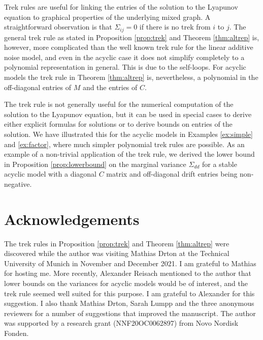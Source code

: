 \documentclass[10pt,twoside,a4paper]{amsart}
\begin{document}
Trek rules are useful for linking the entries of the solution to the Lyapunov
equation to graphical properties of the underlying mixed graph. A
straightforward observation is that $\Sigma_{ij} = 0$ if there is no trek from
$i$ to $j$. The general trek rule as stated in Proposition \ref{prop:trek} 
and Theorem \ref{thm:altrep} is, however,
more complicated than the well known trek rule for the linear additive noise
model, and even in the acyclic case it does not simplify completely to a
polynomial representation in general. This is due to the self-loops. 
For acyclic models the trek rule in Theorem \ref{thm:altrep} is, 
nevertheless, a polynomial in the off-diagonal entries of $M$ and the entries of $C$. 

The trek rule is not generally useful for the numerical computation of the 
solution to the Lyapunov equation, but it can be used in special cases to derive 
either explicit formulas for solutions or to derive bounds on entries of 
the solution. We have illustrated this for the acyclic 
models in Examples \ref{ex:simple} and \ref{ex:factor}, where 
much simpler polynomial trek rules are possible. As an example of a
non-trivial application of the trek rule, we derived the lower bound in
Proposition \ref{prop:lowerbound} on the marginal variance $\Sigma_{dd}$ for a
stable acyclic model with a diagonal $C$ matrix and off-diagonal drift
entries being non-negative. 

\section{Acknowledgements}

The trek rules in Proposition \ref{prop:trek} and Theorem \ref{thm:altrep}
were discovered while the author was visiting Mathias Drton at the Technical University of
Munich in November and December 2021. I am grateful to Mathias for hosting me.
More recently, Alexander Reisach mentioned to the author that lower bounds on 
the variances for acyclic models would be of interest, and the trek rule seemed 
well suited for this purpose. I am grateful to Alexander for this suggestion.
I also thank Mathias Drton, Sarah Lumpp and the three anonymous reviewers 
for a number of suggestions that improved the manuscript.
The author was supported by a research grant (NNF20OC0062897) from Novo Nordisk Fonden.



\end{document}
